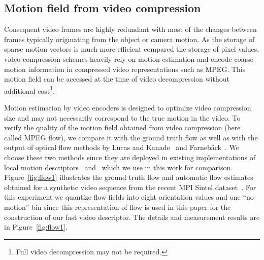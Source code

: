 \documentclass[10pt,twocolumn,letterpaper]{article}
\begin{document}
\subsection{Motion field from video compression}
Consequent video frames are highly redundant with most of the changes between frames typically originating from the object or camera motion. As the storage of sparse motion vectors is much more efficient compared the storage of pixel values, video compression schemes heavily rely on motion estimation and encode coarse motion information in compressed video representations such as MPEG. This motion field can be accessed at the time of video decompression without additional cost\footnote{Full video decompression may not be required.}. %

Motion estimation by video encoders is designed to optimize video compression size and may not necessarily correspond to the true motion in the video. To verify the quality of the motion field obtained from video compression (here called MPEG flow), we compare it with the ground truth flow as well as with the output of optical flow methods by Lucas and Kanade~\cite{Lucas81} and Farneb\"ack~\cite{Farneback03}. We choose these two methods since they are deployed in existing implementations of local motion descriptors~\cite{Laptev08} and~\cite{Wang12} which we use in this work for comparison. Figure~\ref{fig:flow1} illustrates the ground truth flow and automatic flow estimates obtained for a synthetic video sequence from the recent MPI Sintel dataset~\cite{Butler12}. For this experiment we quantize flow fields into eight orientation values and one ``no-motion'' bin since this representation of flow is used in this paper for the construction of our fast video descriptor. The details and measurement results are in Figure~\ref{fig:flow1}.

\end{document}
